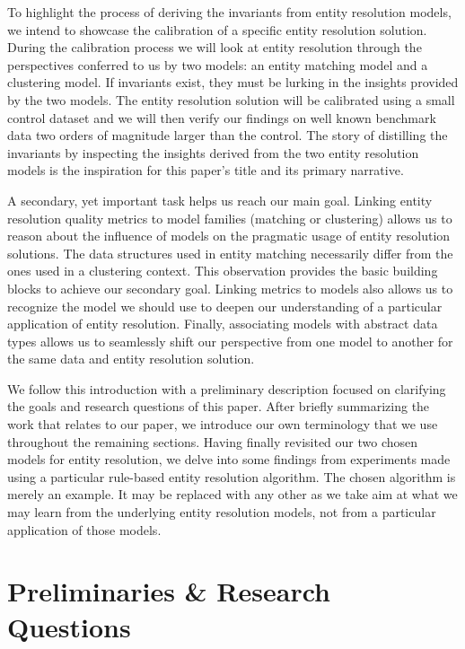 \documentclass[journal]{IEEEtran}
\begin{document}
    To highlight the process of deriving the invariants from entity resolution
    models, we intend to showcase the calibration of a specific entity
    resolution solution.
    During the calibration process we will look at entity resolution through
    the perspectives conferred to us by two models: an entity matching model and
    a clustering model.
    If invariants exist, they must be lurking in the insights provided by the
    two models.
    The entity resolution solution will be calibrated using a small control
    dataset and we will then verify our findings on well known benchmark data
    two orders of magnitude larger than the control.
    The story of distilling the invariants by inspecting the insights derived
    from the two entity resolution models is the inspiration for this paper's
    title and its primary narrative.
    
    A secondary, yet important task helps us reach our main goal.
    Linking entity resolution quality metrics to model families (matching or
    clustering) allows us to reason about the influence of models on the
    pragmatic usage of entity resolution solutions.
    The data structures used in entity matching necessarily differ from the ones
    used in a clustering context.
    This observation provides the basic building blocks to achieve our secondary
    goal.
    Linking metrics to models also allows us to recognize the model we should
    use to deepen our understanding of a particular application of entity
    resolution.
    Finally, associating models with abstract data types allows us to seamlessly
    shift our perspective from one model to another for the same data and entity
    resolution solution.
    
    We follow this introduction with a preliminary description focused on
    clarifying the goals and research questions of this paper.
    After briefly summarizing the work that relates to our paper, we introduce
    our own terminology that we use throughout the remaining sections.
    Having finally revisited our two chosen models for entity resolution, we
    delve into some findings from experiments made using a particular rule-based
    entity resolution algorithm.
    The chosen algorithm is merely an example. It may be replaced with any other
    as we take aim at what we may learn from the underlying entity resolution
    models, not from a particular application of those models.

    \section{Preliminaries \& Research Questions}\label{sec:Preliminaries & Questions}
    
\end{document}
